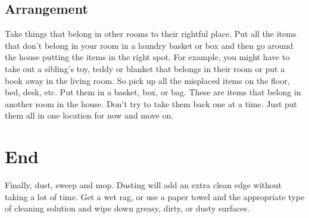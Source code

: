 \documentclass[a4paper,12pt]{article}
\begin{document}
\subsection {Arrangement}
Take things that belong in other rooms to their rightful place. Put all the items that don't belong in your room in a laundry basket or box and then go around the house putting the items in the right spot. For example, you might have to take out a sibling's toy, teddy or blanket that belongs in their room or put a book away in the living room. So pick up all the misplaced items on the floor, bed, desk, etc. Put them in a basket, box, or bag. These are items that belong in another room in the house. Don't try to take them back one at a time. Just put them all in one location for now and move on.

\section {End}
Finally, dust, sweep and mop. Dusting will add an extra clean edge without taking a lot of time. Get a wet rag, or use a paper towel and the appropriate type of cleaning solution and wipe down greasy, dirty, or dusty surfaces.
\end{document}
